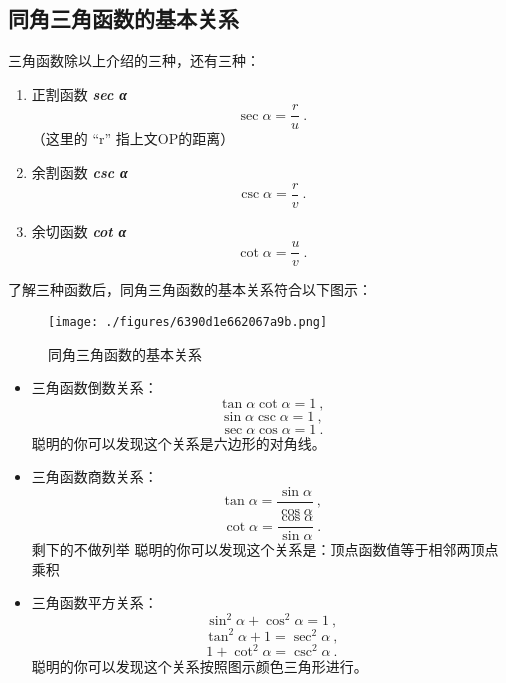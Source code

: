 \subsection{同角三角函数的基本关系}
三角函数除以上介绍的三种，还有三种：
\begin{enumerate}
\item 正割函数 \textbf{\textsl{sec α}} 
\begin{equation}
\sec \alpha = \frac{r}{u}~.
\end{equation}
（这里的 “r” 指上文OP的距离）
\item 余割函数 \textbf{\textsl{csc α}} 
\begin{equation}
\csc \alpha = \frac{r}{v}~.
\end{equation}
\item 余切函数 \textbf{\textsl{cot α}} 
\begin{equation}
\cot \alpha = \frac{u}{v}~.
\end{equation}
\end{enumerate}
了解三种函数后，同角三角函数的基本关系符合以下图示：
\begin{figure}[ht]
\centering
\texttt{[image: ./figures/6390d1e662067a9b.png]}
\caption{同角三角函数的基本关系} \label{fig_HsTrFu_4}
\end{figure}
\begin{itemize}
\item 三角函数倒数关系：
\begin{equation}
\tan \alpha  \cot \alpha = 1~,
\end{equation}
\begin{equation}
\sin \alpha  \csc \alpha = 1~,
\end{equation}
\begin{equation}
\sec \alpha  \cos \alpha = 1~.
\end{equation}
聪明的你可以发现这个关系是六边形的对角线。
\item 三角函数商数关系：
\begin{equation}
\tan \alpha = \frac{\sin \alpha}{\cos \alpha}~,
\end{equation}
\begin{equation}
\cot \alpha = \frac{\cos \alpha}{\sin \alpha}~.
\end{equation}
剩下的不做列举
聪明的你可以发现这个关系是：顶点函数值等于相邻两顶点乘积
\item 三角函数平方关系：
\begin{equation}
\sin ^{2} \alpha + \cos ^{2}\alpha =1~,
\end{equation}
\begin{equation}
\tan  ^{2} \alpha + 1 =\sec ^{2}\alpha~,
\end{equation}
\begin{equation}
1 + \cot ^{2}\alpha =\csc ^{2}\alpha~.
\end{equation}
聪明的你可以发现这个关系按照图示颜色三角形进行。
\end{itemize}
